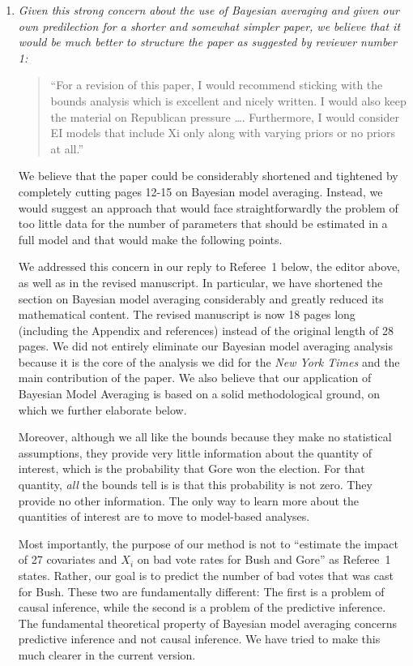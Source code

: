 \documentclass[11pt]{article}
\begin{document}
\begin{enumerate}
  
\item {\it Given this strong concern about the use of Bayesian
    averaging and given our own predilection for a shorter and
    somewhat simpler paper, we believe that it would be much better to
    structure the paper as suggested by reviewer number 1:
    \begin{quote}
      ``For a revision of this paper, I would recommend sticking with
      the bounds analysis which is excellent and nicely written.  I
      would also keep the material on Republican pressure \ldots.
      Furthermore, I would consider EI models that include Xi only along
      with varying priors or no priors at all.''
    \end{quote}
    We believe that the paper could be considerably shortened and
    tightened by completely cutting pages 12-15 on Bayesian model
    averaging.  Instead, we would suggest an approach that would face
    straightforwardly the problem of too little data for the number of
    parameters that should be estimated in a full model and that would
    make the following points.}
  
  We addressed this concern in our reply to Referee~1 below, the
  editor above, as well as in the revised manuscript.  In particular,
  we have shortened the section on Bayesian model averaging
  considerably and greatly reduced its mathematical content.  The
  revised manuscript is now 18 pages long (including the Appendix and
  references) instead of the original length of 28 pages. We did not
  entirely eliminate our Bayesian model averaging analysis because it
  is the core of the analysis we did for the {\it New York Times} and
  the main contribution of the paper.  We also believe that our
  application of Bayesian Model Averaging is based on a solid
  methodological ground, on which we further elaborate below.
  
  Moreover, although we all like the bounds because they make no
  statistical assumptions, they provide very little information about
  the quantity of interest, which is the probability that Gore won the
  election.  For that quantity, \emph{all} the bounds tell is is that
  this probability is not zero.  They provide no other information.
  The only way to learn more about the quantities of interest are to
  move to model-based analyses.
  
  Most importantly, the purpose of our method is not to ``estimate the
  impact of 27 covariates and $X_i$ on bad vote rates for Bush and
  Gore'' as Referee~1 states. Rather, our goal is to predict the
  number of bad votes that was cast for Bush.  These two are
  fundamentally different: The first is a problem of causal inference,
  while the second is a problem of the predictive inference. The
  fundamental theoretical property of Bayesian model averaging
  concerns predictive inference and not causal inference.  We have
  tried to make this much clearer in the current version.
  

\end{enumerate}
\end{document}
